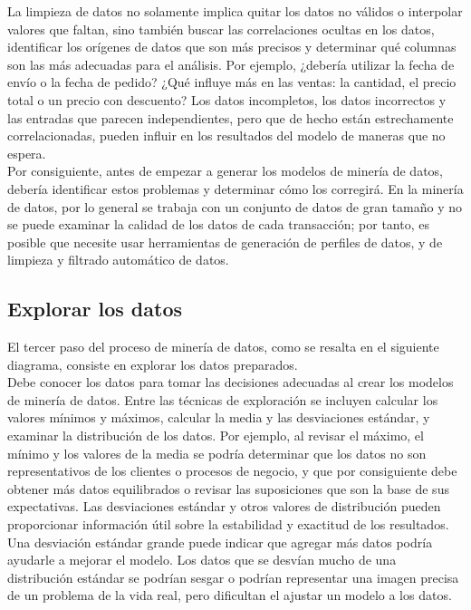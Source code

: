 \documentclass[a4paper, 11pt]{article} %
\begin{document}
La limpieza de datos no solamente implica quitar los datos no válidos o interpolar valores que faltan, sino también buscar las correlaciones ocultas en los datos, identificar los orígenes de datos que son más precisos y determinar qué columnas son las más adecuadas para el análisis. Por ejemplo, ¿debería utilizar la fecha de envío o la fecha de pedido? ¿Qué influye más en las ventas: la cantidad, el precio total o un precio con descuento? Los datos incompletos, los datos incorrectos y las entradas que parecen independientes, pero que de hecho están estrechamente correlacionadas, pueden influir en los resultados del modelo de maneras que no espera.\\

Por consiguiente, antes de empezar a generar los modelos de minería de datos, debería identificar estos problemas y determinar cómo los corregirá. En la minería de datos, por lo general se trabaja con un conjunto de datos de gran tamaño y no se puede examinar la calidad de los datos de cada transacción; por tanto, es posible que necesite usar herramientas de generación de perfiles de datos, y de limpieza y filtrado automático de datos.

\subsection*{Explorar los datos}

El tercer paso del proceso de minería de datos, como se resalta en el siguiente diagrama, consiste en explorar los datos preparados.\\

Debe conocer los datos para tomar las decisiones adecuadas al crear los modelos de minería de datos. Entre las técnicas de exploración se incluyen calcular los valores mínimos y máximos, calcular la media y las desviaciones estándar, y examinar la distribución de los datos. Por ejemplo, al revisar el máximo, el mínimo y los valores de la media se podría determinar que los datos no son representativos de los clientes o procesos de negocio, y que por consiguiente debe obtener más datos equilibrados o revisar las suposiciones que son la base de sus expectativas. Las desviaciones estándar y otros valores de distribución pueden proporcionar información útil sobre la estabilidad y exactitud de los resultados. Una desviación estándar grande puede indicar que agregar más datos podría ayudarle a mejorar el modelo. Los datos que se desvían mucho de una distribución estándar se podrían sesgar o podrían representar una imagen precisa de un problema de la vida real, pero dificultan el ajustar un modelo a los datos.\\
\end{document}
